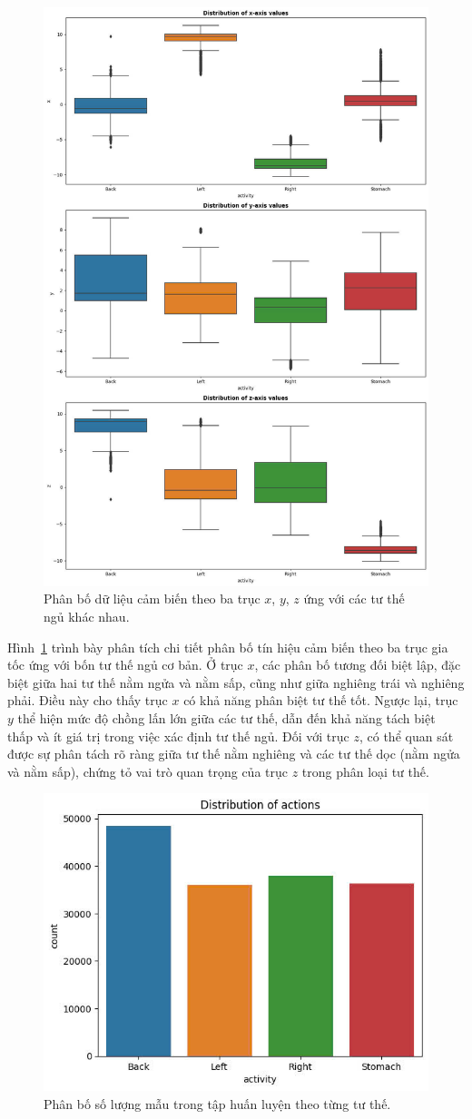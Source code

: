 \begin{figure}[htbp]
\centering
\includegraphics[width=0.7\linewidth]{images/threshhold.jpg} 
\caption{Phân bố dữ liệu cảm biến theo ba trục $x$, $y$, $z$ ứng với các tư thế ngủ khác nhau.}
\label{fig:axis_distribution}
\end{figure}
Hình~\ref{fig:axis_distribution} trình bày phân tích chi tiết phân bố 
tín hiệu cảm biến theo ba trục gia tốc ứng với bốn tư thế ngủ cơ bản. 
Ở trục $x$, các phân bố tương đối biệt lập, đặc biệt giữa hai tư thế 
nằm ngửa và nằm sấp, cũng như giữa nghiêng trái và nghiêng phải. 
Điều này cho thấy trục $x$ có khả năng phân biệt tư thế tốt. 
Ngược lại, trục $y$ thể hiện mức độ chồng lấn lớn giữa các tư thế, 
dẫn đến khả năng tách biệt thấp và ít giá trị trong việc xác định tư 
thế ngủ. Đối với trục $z$, có thể quan sát được sự phân tách 
rõ ràng giữa tư thế nằm nghiêng và các tư thế dọc 
(nằm ngửa và nằm sấp), chứng tỏ vai trò quan trọng của trục $z$ 
trong phân loại tư thế.



\begin{figure}[htbp]
\centering
\includegraphics[width=0.6\linewidth]{images/distribution actions.jpg} 
\caption{Phân bố số lượng mẫu trong tập huấn luyện theo từng tư thế.}
\label{fig:countActions}
\end{figure}


